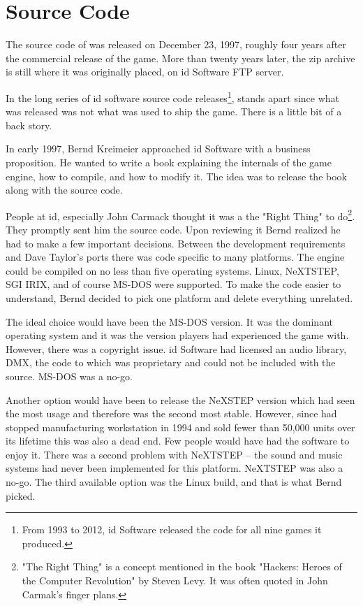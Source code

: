 \section{Source Code}
The source code of \doom{} was released on December 23, 1997, roughly four years after the commercial release of the game. More than twenty years later, the zip archive is still where it was originally placed, on id Software FTP server.\\
\par
{}
\par
 In the long series of id software source code releases\footnote{From 1993 to 2012, id Software released the code for all nine games it produced.}, \doom{} stands apart since what was released was not what was used to ship the game. There is a little bit of a back story.\\
 \par
 In early 1997, Bernd Kreimeier approached id Software with a business proposition. He wanted to write a book explaining the internals of the game engine, how to compile, and how to modify it. The idea was to release the book along with the source code.\\
 \par
  People at id, especially John Carmack thought it was a the "Right Thing" to do\footnote{"The Right Thing" is a concept mentioned in the book "Hackers: Heroes of the Computer Revolution" by Steven Levy. It was often quoted in John Carmak's finger plans.}. They promptly sent him the source code. Upon reviewing it Bernd realized he had to make a few important decisions. Between the development requirements and Dave Taylor's ports there was code specific to many platforms. The engine could be compiled on no less than five operating systems. Linux, NeXTSTEP, SGI IRIX, and of course MS-DOS were supported. To make the code easier to understand, Bernd decided to pick one platform and delete everything unrelated.\\
  \par
  The ideal choice would have been the MS-DOS version. It was the dominant operating system and it was the version players had experienced the game with. However, there was a copyright issue. id Software had licensed an audio library, DMX, the code to which was proprietary and could not be included with the source. MS-DOS was a no-go.\\
  \par
   Another option would have been to release the NeXSTEP version which had seen the most usage and therefore was the second most stable. However, since \NeXT had stopped manufacturing workstation in 1994 and sold fewer than 50,000 units over its lifetime this was also a dead end. Few people would have had the software to enjoy it. There was a second problem with NeXTSTEP -- the sound and music systems had never been implemented for this platform. NeXTSTEP was also a no-go. The third available option was the Linux build, and that is what Bernd picked.\\
